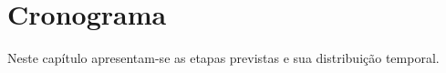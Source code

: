 \chapter{Cronograma}\label{cha:crono}


Neste capítulo apresentam-se as etapas previstas e sua distribuição temporal.


